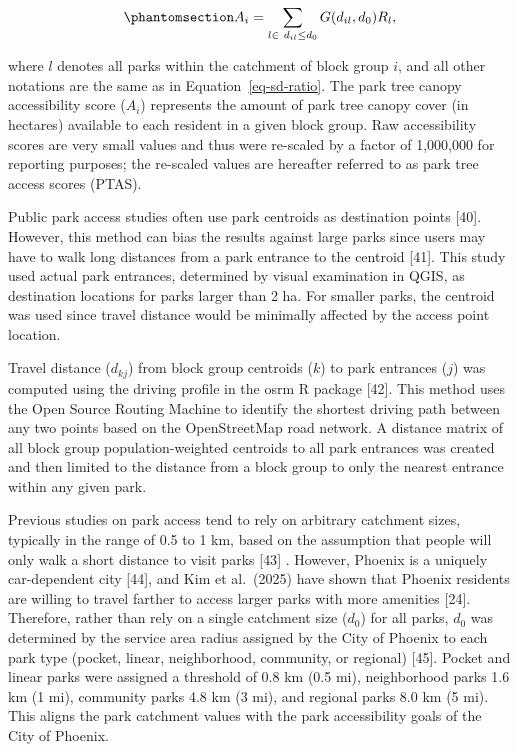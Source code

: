 \documentclass[
  sn-basic,
]{sn-jnl}
\begin{document}
\begin{equation}\protect\phantomsection\label{eq-access}{A_i = \sum_{l \in \ d_{il} \leq d_0} G (d_{il}, d_0)R_l,}\end{equation}

where \(l\) denotes all parks within the catchment of block group \(i\),
and all other notations are the same as in Equation~\ref{eq-sd-ratio}.
The park tree canopy accessibility score (\(A_i\)) represents the amount
of park tree canopy cover (in hectares) available to each resident in a
given block group. Raw accessibility scores are very small values and
thus were re-scaled by a factor of 1,000,000 for reporting purposes; the
re-scaled values are hereafter referred to as park tree access scores
(PTAS).

Public park access studies often use park centroids as destination
points {[}40{]}. However, this method can bias the results against large
parks since users may have to walk long distances from a park entrance
to the centroid {[}41{]}. This study used actual park entrances,
determined by visual examination in QGIS, as destination locations for
parks larger than 2 ha. For smaller parks, the centroid was used since
travel distance would be minimally affected by the access point
location.

Travel distance (\(d_{kj}\)) from block group centroids (\(k\)) to park
entrances (\(j\)) was computed using the driving profile in the osrm R
package {[}42{]}. This method uses the Open Source Routing Machine to
identify the shortest driving path between any two points based on the
OpenStreetMap road network. A distance matrix of all block group
population-weighted centroids to all park entrances was created and then
limited to the distance from a block group to only the nearest entrance
within any given park.

Previous studies on park access tend to rely on arbitrary catchment
sizes, typically in the range of 0.5 to 1 km, based on the assumption
that people will only walk a short distance to visit parks {[}43{]} .
However, Phoenix is a uniquely car-dependent city {[}44{]}, and Kim et
al.~(2025) have shown that Phoenix residents are willing to travel
farther to access larger parks with more amenities {[}24{]}. Therefore,
rather than rely on a single catchment size (\(d_0\)) for all parks,
\(d_0\) was determined by the service area radius assigned by the City
of Phoenix to each park type (pocket, linear, neighborhood, community,
or regional) {[}45{]}. Pocket and linear parks were assigned a threshold
of 0.8 km (0.5 mi), neighborhood parks 1.6 km (1 mi), community parks
4.8 km (3 mi), and regional parks 8.0 km (5 mi). This aligns the park
catchment values with the park accessibility goals of the City of
Phoenix.
\end{document}
